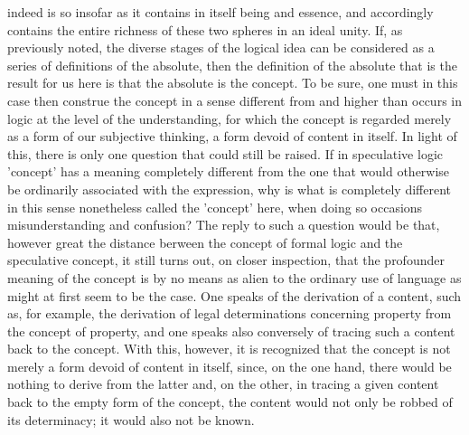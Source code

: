 indeed is so insofar as it contains in itself being and essence, and accordingly
contains the entire richness of these two spheres in an ideal unity.
If, as previously noted, the diverse stages of the logical idea can be considered as a
series of definitions of the absolute, then the definition of the absolute
that is the result for us here is that the absolute is the concept.
To be sure, one must in this case then construe the concept in a sense different from and higher than occurs in
logic at the level of the understanding, for which the concept is regarded merely
as a form of our subjective thinking, a form devoid of content in itself.
 In light of this, there is only one question that could still be raised.
If in speculative logic 'concept' has a meaning completely different from the one that would otherwise
be ordinarily associated with the expression, why is what is completely different in
this sense nonetheless called the 'concept' here, when doing so
occasions misunderstanding and confusion?
The reply to such a question would be that,
however great the distance berween the concept of formal logic and
the speculative concept, it still turns out, on closer inspection, that the profounder
meaning of the concept is by no means as alien to the ordinary use of language as
might at first seem to be the case.
One speaks of the derivation of a content, such
as, for example, the derivation of legal determinations concerning property from
the concept of property, and one speaks also conversely of tracing such a content
back to the concept. With this, however, it is recognized that the concept is not
merely a form devoid of content in itself, since, on the one hand, there would be
nothing to derive from the latter and, on the other, in tracing a given content back
to the empty form of the concept, the content would not only be robbed of its
determinacy; it would also not be known.


